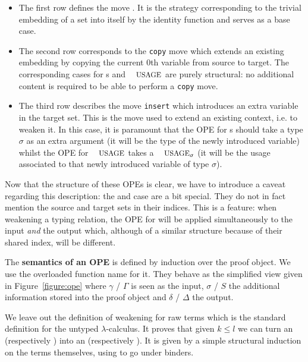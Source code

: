 \begin{itemize}

\item The first row defines the move \opedone{}. It is the strategy
corresponding to the trivial embedding of a set into itself by
the identity function and serves as a base case.

\item The second row corresponds to the \texttt{copy} move which extends
an existing embedding by copying the current $0$th variable from
source to target. The corresponding cases for \Context{}s and
$\Usages{}$ are purely structural: no additional content is required
to be able to perform a \texttt{copy} move.

\item The third row describes the move \texttt{insert}
which introduces an extra variable in the target set. This is the
move used to extend an existing context, i.e. to weaken it. In this
case, it is paramount that the OPE for \Context{}s should take a
type \ensuremath{\sigma} as an extra argument (it will be the type of the newly introduced
variable) whilst the OPE for $\Usages{}$ takes a $\Usage{\ensuremath{\sigma}}$ (it will
be the usage associated to that newly introduced variable of type \ensuremath{\sigma}).
\end{itemize}

Now that the structure of these OPEs is clear, we have to introduce a caveat
regarding this description: the \Context{} and \Usages{} case are a bit special.
They do not in fact mention the source and target sets in their indices. This
is a feature: when weakening a typing relation, the OPE for \Usages{} will be
applied simultaneously to the input \emph{and} the output \Usages{} which,
although of a similar structure because of their shared \Context{} index,
will be different.

\begin{definition}The \textbf{semantics of an OPE} is defined by induction
over the proof object. We use the overloaded function name \ope{\cdot} for it.
They behave as the simplified view given in Figure~\ref{figure:ope} where
$\gamma$ / $\Gamma$ is seen as the input, $\sigma$ / $S$ the additional
information stored into the proof object and $\delta$ / $\Delta$ the output.
\end{definition}

We leave out the definition of weakening for raw terms which is the standard
definition for the untyped \ensuremath{\lambda}-calculus. It proves that given $k \leq l$ we can
turn an  (respectively ) into an 
(respectively ). It is given by a simple structural induction on
the terms themselves, using \opecopy{} to go under binders.

